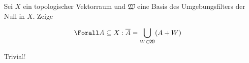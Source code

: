 \begin{exercise}

Sei $X$ ein topologischer Vektorraum und $\mathfrak{W}$ eine Basis des Umgebungsfilters der Null in $X$.
Zeige

\begin{align*}
  \Forall A \subseteq X:
  \overline{A} = \bigcup_{W \in \mathfrak{W}}(A + W)
\end{align*}

\end{exercise}

\begin{solution}

Trivial!

\end{solution}
